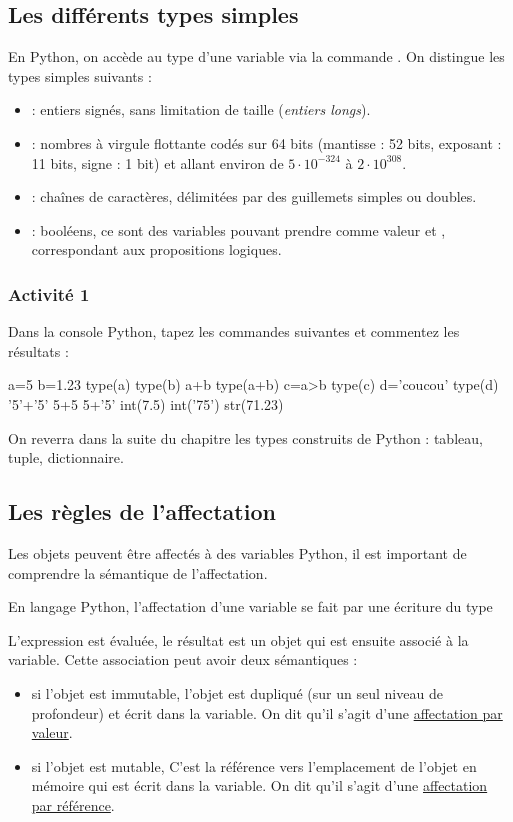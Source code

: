 \documentclass[11pt,a4paper,french,twoside]{PMCours}
\begin{document}
\subsection{Les différents types simples}
En Python, on accède au type d'une variable via la commande . On 
distingue les types simples suivants :
\begin{itemize}
\item {} : entiers signés, sans limitation de taille (\emph{entiers longs}).
\item {} : nombres à virgule flottante codés sur 64 bits (mantisse : 52 bits,
exposant : 11 bits, signe : 1 bit) et allant environ de $5\cdot10^{-324}$ à $2\cdot 10^{308}$.
\item {} : chaînes de caractères, délimitées par des guillemets simples 
ou doubles.
\item {} : booléens, ce sont des variables pouvant prendre comme valeur 
 et , correspondant aux propositions logiques. 
\end{itemize}
\subsubsection*{Activité 1}
Dans la console Python, tapez les commandes suivantes et commentez les résultats :
\begin{Python}
a=5
b=1.23
type(a)
type(b)
a+b
type(a+b)
c=a>b
type(c)
d='coucou'
type(d)
'5'+'5'
5+5
5+'5'
int(7.5)
int('75')
str(71.23)
\end{Python}
On reverra dans la suite du chapitre les types construits de Python : tableau, 
tuple, dictionnaire. 

\subsection{Les règles de l'affectation}
Les objets peuvent être affectés à des variables Python, il est important de 
comprendre la sémantique de l'affectation. 

En langage Python, l'affectation d'une variable se fait par une écriture du type

\smallskip
\centerline{}

\smallskip
L'expression est évaluée, le résultat est un objet qui est ensuite associé à la 
variable. Cette association peut avoir deux sémantiques :
\begin{itemize}
\item si l'objet est immutable, l'objet est dupliqué (sur un seul niveau de 
profondeur) et écrit dans la variable. On dit qu'il s'agit d'une 
\underline{affectation par valeur}.
\item si l'objet est mutable, C'est la référence vers l'emplacement de l'objet
en mémoire qui est écrit dans la variable. On dit qu'il s'agit d'une 
\underline{affectation par référence}.
\end{itemize}
\end{document}
